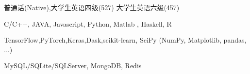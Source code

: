 
\begin{cvtbl}
        {普通话(Native),大学生英语四级(527) 大学生英语六级(457)}%

        {C/C++, JAVA, Javascript, Python, Matlab , Haskell, R}

        {TensorFlow,PyTorch,Keras,Dask,scikit-learn, SciPy (NumPy, Matplotlib, pandas, ...)}

        {MySQL/SQLite/SQLServer, MongoDB, Redis}

\end{cvtbl}

\endinput